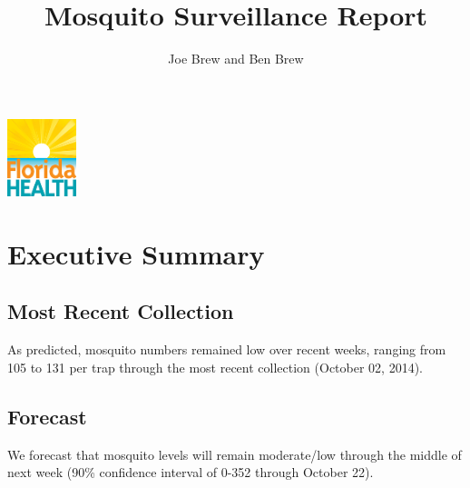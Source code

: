 \documentclass{article}
\begin{document}


\title{\textbf{Mosquito Surveillance Report}}
\author{Joe Brew and Ben Brew}


\maketitle
\tableofcontents

\vspace{40mm}

\begin{center}
\includegraphics[width=2cm]{doh}
\end{center}





\fancyhfoffset[E,O]{0pt}


\vspace*{30mm}
\section*{Executive Summary}
\hrulefill




\begin{multicols}{2} 


\subsection*{Most Recent Collection}

As predicted, mosquito numbers remained low over recent weeks, ranging from 105 to 131 per trap through the most recent collection (October 02, 2014).  

\vfill
\columnbreak



\subsection*{Forecast}

We forecast that mosquito levels will remain moderate/low through the middle of next week (90\% confidence interval of 0-352 through October 22). 



\end{multicols}
\end{document}
